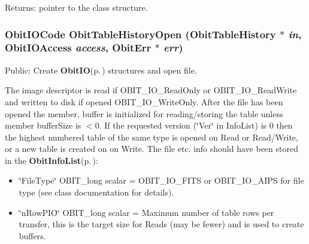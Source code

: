 \begin{Desc}
\item[Returns:]pointer to the class structure. \end{Desc}
\subsubsection{\setlength{\rightskip}{0pt plus 5cm}Obit\-IOCode Obit\-Table\-History\-Open ({\bf Obit\-Table\-History} $\ast$ {\em in}, Obit\-IOAccess {\em access}, {\bf Obit\-Err} $\ast$ {\em err})}\label{ObitTableHistory_8h_a17}


Public: Create {\bf Obit\-IO}{\rm (p.\,\pageref{structObitIO})} structures and open file. 

The image descriptor is read if OBIT\_\-IO\_\-Read\-Only or OBIT\_\-IO\_\-Read\-Write and written to disk if opened OBIT\_\-IO\_\-Write\-Only. After the file has been opened the member, buffer is initialized for reading/storing the table unless member buffer\-Size is $<$0. If the requested version (\char`\"{}Ver\char`\"{} in Info\-List) is 0 then the highest numbered table of the same type is opened on Read or Read/Write, or a new table is created on on Write. The file etc. info should have been stored in the {\bf Obit\-Info\-List}{\rm (p.\,\pageref{structObitInfoList})}: \begin{itemize}
\item \char`\"{}File\-Type\char`\"{} OBIT\_\-long scalar = OBIT\_\-IO\_\-FITS or OBIT\_\-IO\_\-AIPS for file type (see class documentation for details). \item \char`\"{}n\-Row\-PIO\char`\"{} OBIT\_\-long scalar = Maximum number of table rows per transfer, this is the target size for Reads (may be fewer) and is used to create buffers. 
\end{itemize}
